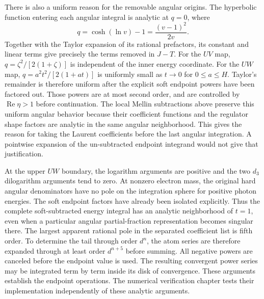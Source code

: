 There is also a uniform reason for the removable angular origins. The
hyperbolic function entering each angular integral is analytic at
$q=0$, where
\begin{equation}
 q=\cosh(\ln v)-1=\frac{(v-1)^2}{2v}.
\end{equation}
Together with the Taylor expansion of its rational prefactors, its
constant and linear terms give precisely the terms removed in $J-T$. For the $UV$ map, $q=\zeta^2/[2(1+\zeta)]$ is independent
of the inner energy coordinate. For the $UW$ map,
$q=a^2t^2/[2(1+at)]$ is uniformly small as $t\to0$ for $0\leq a\leq H$.
Taylor's remainder is therefore uniform after the explicit soft endpoint
powers have been factored out. Those powers are at most second order,
and are controlled by $\operatorname{Re}\eta>1$ before continuation.
The local Mellin subtractions above preserve this uniform angular
behavior because their coefficient functions and the regulator shape
factors are analytic in the same angular neighborhood.
This gives the reason for taking the Laurent coefficients before the
last angular integration. A pointwise expansion of the un-subtracted
endpoint integrand would not give that justification.

At the upper $UW$ boundary, the logarithm arguments are positive and
the two $d_3$ dilogarithm arguments tend to zero. At nonzero electron mass, the original hard angular denominators have
no pole on the integration sphere for positive photon energies. The
soft endpoint factors have already been isolated explicitly. Thus the
complete soft-subtracted energy integral has an analytic neighborhood
of $t=1$, even when a particular angular partial-fraction representation
becomes singular there.
The largest apparent rational pole in the separated coefficient list is
fifth order. To determine the tail through order $d^n$, the atom series
are therefore expanded through at least order $d^{n+5}$ before summing.
All negative powers are canceled before the endpoint value is used.
The resulting convergent power series may be integrated term by term
inside its disk of convergence. These arguments establish the endpoint
operations. The numerical verification chapter
tests their implementation independently of these analytic arguments.

